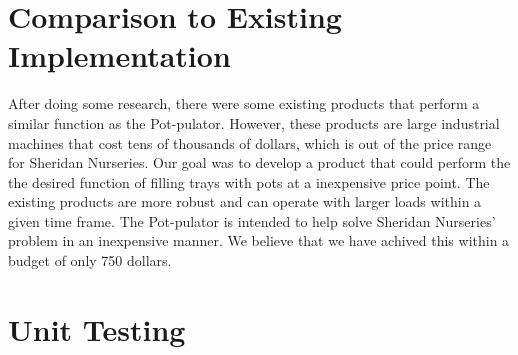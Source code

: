 \documentclass[12pt, titlepage]{article}
\begin{document}
\section{Comparison to Existing Implementation}	

After doing some research, there were some existing products that perform a similar 
function as the Pot-pulator. However, these products are large industrial machines that cost tens of thousands of dollars,
which is out of the price range for Sheridan Nurseries. Our goal was to develop a product that could perform the
the desired function of filling trays with pots at a inexpensive price point. The existing products are more robust and can operate
with larger loads within a given time frame. The Pot-pulator is intended to help solve Sheridan Nurseries' problem in an inexpensive
manner. We believe that we have achived this within a budget of only 750 dollars.

\section{Unit Testing}
\end{document}
